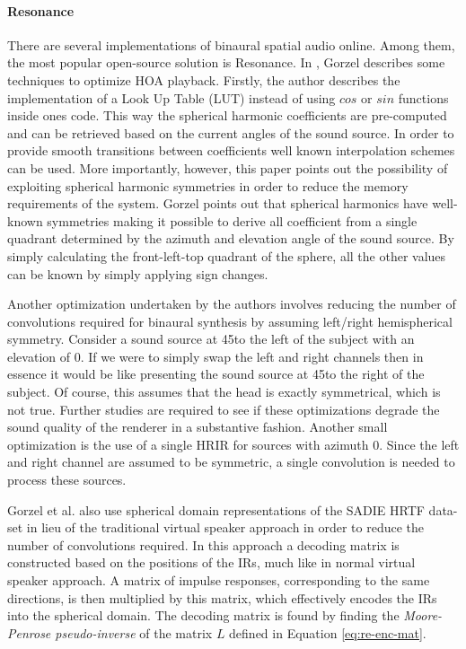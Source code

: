 \paragraph{Resonance}

There are several implementations of binaural spatial audio online. Among them, the most popular open-source solution is Resonance. In \cite{gorzel2019efficient}, Gorzel describes some techniques to optimize HOA playback. Firstly, the author describes the implementation of a Look Up Table (LUT) instead of using $cos$ or $sin$ functions inside ones code. This way the spherical harmonic coefficients are pre-computed and can be retrieved based on the current angles of the sound source. In order to provide smooth transitions between coefficients well known interpolation schemes can be used. More importantly, however, this paper points out the possibility of exploiting spherical harmonic symmetries in order to reduce the memory requirements of the system. Gorzel points out that spherical harmonics have well-known symmetries making it possible to derive all coefficient from a single quadrant determined by the azimuth and elevation angle of the sound source. By simply calculating the front-left-top quadrant of the sphere, all the other values can be known by simply applying sign changes. 

Another optimization undertaken by the authors involves reducing the number of convolutions required for binaural synthesis by assuming left/right hemispherical symmetry. Consider a sound source at 45\textdegree to the left of the subject with an elevation of 0\textdegree. If we were to simply swap the left and right channels then in essence it would be like presenting the sound source at 45\textdegree to the right of the subject. Of course, this assumes that the head is exactly symmetrical, which is not true. Further studies are required to see if these optimizations degrade the sound quality of the renderer in a substantive fashion. Another small optimization is the use of a single HRIR for sources with azimuth 0. Since the left and right channel are assumed to be symmetric, a single convolution is needed to process these sources. 

Gorzel et al. also use spherical domain representations of the SADIE HRTF data-set in lieu of the traditional virtual speaker approach in order to reduce the number of convolutions required. In this approach a decoding matrix is constructed based on the positions of the IRs, much like in normal virtual speaker approach. A matrix of impulse responses, corresponding to the same directions, is then multiplied by this matrix, which effectively encodes the IRs into the spherical domain. The decoding matrix is found by finding the \textit{Moore-Penrose pseudo-inverse} of the matrix $L$ defined in Equation \ref{eq:re-enc-mat}. 

